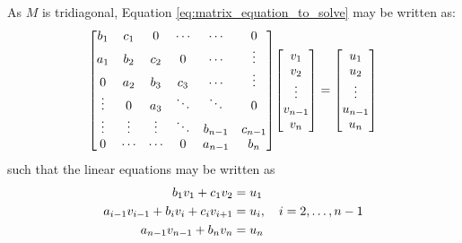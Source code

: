 \documentclass[reprint,english]{revtex4-1}
\begin{document}
As \(M\) is tridiagonal, Equation \eqref{eq:matrix_equation_to_solve} may be written as:
\[\mqty[b_1 & c_1 & 0 & \cdots & \cdots & 0 \\
a_1 & b_2 & c_2 & 0 & \cdots & \vdots \\
0 & a_2 & b_3 & c_3 & \cdots & \vdots \\
\vdots & 0 & a_3 & \ddots & \ddots & 0 \\
\vdots & \vdots & \vdots & \ddots & b_{n-1} & c_{n-1} \\
0 & \cdots & \cdots & 0 & a_{n-1} & b_n]\mqty[v_1 \\ v_2 \\ \vdots \\ v_{n-1} \\ v_n]=\mqty[u_1 \\ u_2 \\ \vdots \\ u_{n-1} \\ u_n]\]
such that the linear equations may be written as
\begin{align*}
b_1v_1+c_1v_2&=u_1\\
a_{i-1}v_{i-1}+b_iv_i+c_iv_{i+1}&=u_i\qc i=2,\ldots,n-1\\
a_{n-1}v_{n-1}+b_nv_n&=u_n
\end{align*}
\end{document}
